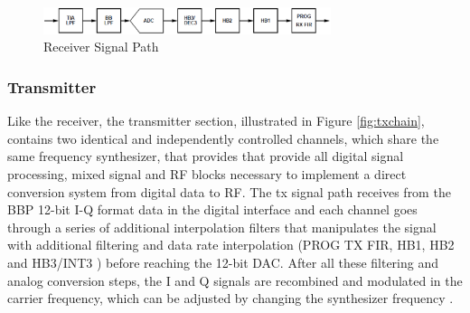 \begin{figure}[htbp]
    \centering
    \includegraphics[width=0.75\textwidth]{./figures/rx_chain}
    \caption{ Receiver Signal Path
    \label{fig:rxchain}}
\end{figure}


\subsubsection{Transmitter}




Like the receiver, the transmitter section, illustrated in Figure
\ref{fig:txchain}, contains two identical and independently controlled channels,
which share the same frequency synthesizer, that provides that provide all
digital signal processing, mixed signal and RF blocks necessary to implement a
direct conversion system from digital data to RF. The tx signal path receives
from the BBP 12-bit I-Q format data in the digital interface and each channel
goes through a series of additional interpolation filters that manipulates the
signal with additional filtering and data rate interpolation (PROG TX FIR, HB1,
HB2 and HB3/INT3 ) before reaching the 12-bit DAC. After all these filtering and
analog conversion steps, the I and Q signals are recombined and modulated in the
carrier frequency, which can be adjusted by changing the synthesizer frequency
\cite{ad:ad9361}.

